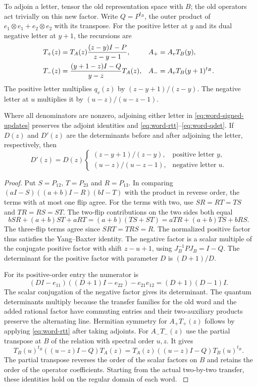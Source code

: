To adjoin a letter, tensor the old representation space with \(B\); the old operators act trivially on this new factor.
Write \(Q=P^{t_B}\), the outer product of
\(e_1\otimes e_1+e_2\otimes e_2\) with its transpose.
For the positive letter at \(y\) and its dual negative letter
at \(y+1\), the recursions are
\begin{align}
 T_+(z)&=T_A(z)\frac{(z-y)I-P}{z-y-1},
 & A_+&=A_vT_B(y),\notag\\
 T_-(z)&=\frac{(y+1-z)I-Q}{y-z}T_A(z),
 & A_-&=A_vT_B(y+1)^{t_B}.\label{eq:word-signed-updates}
\end{align}
The positive letter multiplies \(q_v(z)\) by
\((z-y+1)/(z-y)\). The negative letter at \(u\) multiplies it
by \((u-z)/(u-z-1)\).

\begin{lemma}\label{lem:word-update-identities}
Where all denominators are nonzero, adjoining either letter in
\eqref{eq:word-signed-updates} preserves the adjoint identities
and \eqref{eq:word-rtt}--\eqref{eq:word-qdet}. If \(D(z)\) and \(D'(z)\) are the determinants before and after adjoining the letter, respectively, then 
\[
 D'(z)=D(z)\begin{cases}(z-y+1)/(z-y),&\text{positive letter }y,\\ (u-z)/(u-z-1),&\text{negative letter }u.\end{cases}
\]

\end{lemma}

\begin{proof}
Put \(S=P_{12}\), \(T=P_{23}\) and \(R=P_{13}\). In comparing
\((aI-S)((a+b)I-R)(bI-T)\) with the product in reverse order,
the terms with at most one flip agree. For the terms with two,
use \(SR=RT=TS\) and \(TR=RS=ST\). The two-flip contributions
on the two sides both equal
\[
    bSR+(a+b)ST+aRT=(a+b)(TS+ST)
                     =aTR+(a+b)TS+bRS.
\]
The three-flip terms agree since \(SRT=TRS=R\). The normalized positive factor thus satisfies
the Yang--Baxter identity.
The negative factor is a scalar multiple of the conjugate positive
factor with shift \(z-u+1\), using
\(J_B^{-1}P J_B=I-Q\). The determinant for the positive factor
with parameter \(D\) is \((D+1)/D\).

For its positive-order entry the numerator is
\[
 (DI-e_{11})((D+1)I-e_{22})-e_{21}e_{12}=(D+1)(D-1)I .
\]
The scalar conjugation of the negative factor gives its determinant.
The quantum determinants multiply because the transfer families
for the old word and the added rational factor have commuting
entries and their two-auxiliary products preserve the alternating
line. Hermitian symmetry for \(A_+T_+(z)\) follows by applying
\eqref{eq:word-rtt} after taking adjoints. For \(A_-T_-(z)\)
use the partial transpose at \(B\) of the relation with spectral
order \(u,z\). It gives
\[
 T_B(u)^{t_B}((u-z)I-Q)T_A(z)
  =T_A(z)((u-z)I-Q)T_B(u)^{t_B}.
\]
The partial transpose reverses the order of the scalar factors
on \(B\) and retains the order of the operator coefficients.
Starting from the actual two-by-two transfer, these identities
hold on the regular domain of each word. \label{cor:word-pairing-1}

\end{proof}

